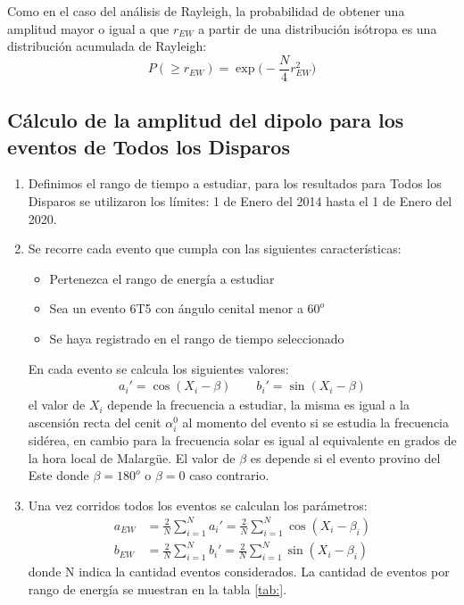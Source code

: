 Como en el caso del análisis de Rayleigh, la probabilidad de obtener una amplitud mayor o igual a que $r_{EW}$ a partir de una distribución isótropa es una distribución acumulada de Rayleigh:
\begin{equation}
    P(\geq r_{EW}) = \exp \Big(-\frac{N}{4}r^2_{EW}\Big) \label{p99}
\end{equation}

\subsection{Cálculo  de la amplitud del dipolo para los eventos de Todos los Disparos}

\begin{enumerate}
    \item Definimos el rango de tiempo a estudiar, para los resultados para Todos los Disparos se utilizaron los límites: 1 de Enero del 2014 hasta el 1 de Enero del 2020.
    \item Se recorre cada evento que cumpla con las siguientes características:
     \begin{itemize}
        \item Pertenezca el rango de energía a estudiar
        \item Sea un evento 6T5 con ángulo cenital menor a $60^o$
        \item Se haya registrado en el rango de tiempo seleccionado
    \end{itemize}
    En cada evento se calcula los siguientes valores:
    \begin{align}
        a_i' = \cos(X_i - \beta) \qquad
        b_i' = \sin(X_i - \beta)
    \end{align}
    el valor de $X_i$ depende la frecuencia a estudiar, la misma es igual a la ascensión recta del cenit $\alpha^0_i$ al momento del evento  si se estudia la frecuencia sidérea, en cambio para la frecuencia solar es igual al equivalente en grados de la hora local de Malargüe. El valor de $\beta$ es depende si el evento provino del Este donde $\beta=180^o$ o $\beta=0$ caso contrario.
    
    \item Una vez corridos todos los  eventos se calculan los parámetros:
    \begin{align*}
        a_{EW} &= \frac{2}{N} \sum^N_{i=1}a_i' =\frac{2}{N} \sum^N_{i=1} \cos(X_i - \beta_i)\\
        b_{EW} &= \frac{2}{N} \sum^N_{i=1}b_i' =\frac{2}{N} \sum^N_{i=1} \sin(X_i - \beta_i)
    \end{align*}
    donde N indica la cantidad eventos considerados. La cantidad de eventos por rango de energía se muestran en la tabla \ref{tab:}.


\end{enumerate}
